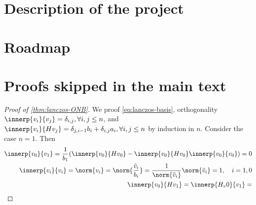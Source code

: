 \section{Description of the project}

\section{Roadmap}
\appendix

\section{Proofs skipped in the main text}
\begin{proof}[Proof of \cref{thm:lanczos-ONB}]
    We proof \cref{eq:lanczos-basis}, orthogonality \(\innerp{v_i}{v_j} = \delta_{i,j}, \forall i,j \leq n\), and \(\innerp{v_i}{H v_j} = \delta_{j, i-1} b_i + \delta_{i,j} a_i, \forall i,j \leq n\) by induction in \(n\).
    Consider the case \(n=1\).
    Then 
    \begin{align}
        \innerp{v_0}{v_1} = \frac{1}{b_1} \of*{ \innerp{v_0}{H v_0} - \innerp{v_0}{H v_0} \innerp{v_0}{v_0} } = 0
        \\
        \innerp{v_i}{v_i} = \norm{v_i} = \norm{\frac{\tilde v_i}{b_i}} = \frac{1}{\norm{\tilde v_i}}\norm{\tilde v_i} = 1, \quad i = 1,0
        \\
        \innerp{v_0}{H v_1} = \innerp{H_v 0}{v_1} = 
    \end{align}
\end{proof}


